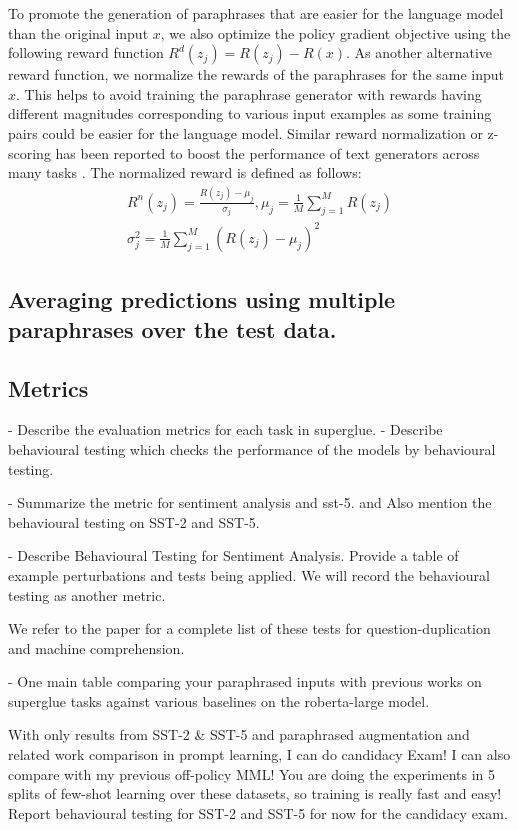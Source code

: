 \documentclass[11pt]{article}
\begin{document}
To promote the generation of paraphrases that are easier for the language model than the original input $x$, we also optimize the policy gradient objective using the following reward function $R^{d}(z_{j}) = R(z_{j}) - R(x)$. As another alternative reward function, we normalize the rewards of the paraphrases for the same input $x$. This helps to avoid training the paraphrase generator with rewards having different magnitudes corresponding to various input examples as some training pairs could be easier for the language model. Similar reward normalization or z-scoring has been reported to boost the performance of text generators across many tasks \cite{guo-etal-2022-efficient}. The normalized reward is defined as follows:
\begin{multline}
R^{n}(z_{j}) = \frac{R(z_{j}) - \mu_{j}}{\sigma_{j}}, \mu_{j} = \frac{1}{M} \sum^{M}_{j=1} R(z_{j}) \\
\sigma^{2}_{j} = \frac{1}{M} \sum^{M}_{j=1} (R(z_{j}) - \mu_{j})^2
\label{normal-reward}
\end{multline}

\subsection{Averaging predictions using multiple paraphrases over the test data.}

\subsection{Metrics}
- Describe the evaluation metrics for each task in superglue.
- Describe behavioural testing which checks the performance of the models by behavioural testing.

- Summarize the metric for sentiment analysis and sst-5. and Also mention the behavioural testing on SST-2 and SST-5. 

- Describe Behavioural Testing for Sentiment Analysis. Provide a table of example perturbations and tests being applied. We will record the behavioural testing as another metric.

We refer to the paper for a complete list of these tests for question-duplication and machine comprehension.


- One main table comparing your paraphrased inputs with previous works on superglue tasks against various baselines on the roberta-large model.

    With only results from SST-2 & SST-5 and paraphrased augmentation and related work comparison in prompt learning, I can do candidacy Exam! I can also compare with my previous off-policy MML! You are doing the experiments in 5 splits of few-shot learning over these datasets, so training is really fast and easy!
    Report behavioural testing for SST-2 and SST-5 for now for the candidacy exam.
\end{document}
